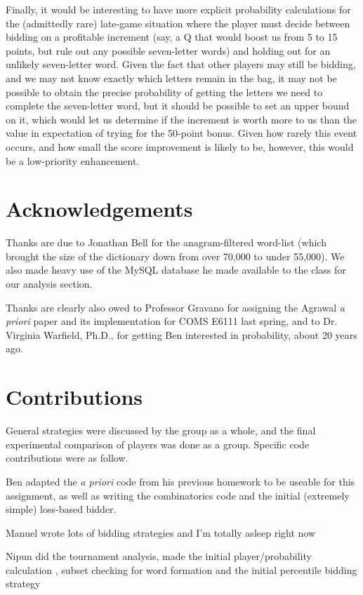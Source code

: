\documentclass[11pt]{article}
\begin{document}
Finally, it would be interesting to have more explicit probability calculations for the (admittedly rare) late-game situation where the player must decide between bidding on a profitable increment (say, a Q that would boost us from 5 to 15 points, but rule out any possible seven-letter words) and holding out for an unlikely seven-letter word. Given the fact that other players may still be bidding, and we may not know exactly which letters remain in the bag, it may not be possible to obtain the precise probability of getting the letters we need to complete the seven-letter word, but it should be possible to set an upper bound on it, which would let us determine if the increment is worth more to us than the value in expectation of trying for the 50-point bonus.  Given how rarely this event occurs, and how small the score improvement is likely to be, however, this would be a low-priority enhancement.



\section{Acknowledgements}

Thanks are due to Jonathan Bell for the anagram-filtered word-list (which brought the size of the dictionary down from over 70,000 to under 55,000).  We also made heavy use of the MySQL database he made available to the class for our analysis section.

Thanks are clearly also owed to Professor Gravano for assigning the Agrawal {\it a priori} paper and its implementation for COMS E6111 last spring, and to Dr. Virginia Warfield, Ph.D., for getting Ben interested in probability, about 20 years ago.

\section{Contributions}
General strategies were discussed by the group as a whole, and the final experimental comparison of players was done as a group.  Specific code contributions were as follow.

Ben adapted the {\it a priori} code from his previous homework to be useable for this assignment, as well as writing the combinatorics code and the initial (extremely simple) loss-based bidder.

Manuel wrote lots of bidding strategies and I'm totally asleep right now

Nipun did the tournament analysis, made the initial player/probability calculation , subset checking for word formation and the initial percentile bidding strategy
\end{document}
